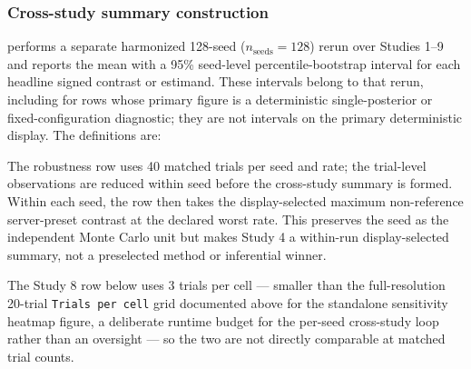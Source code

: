 \documentclass[
  english,
]{article}
\theoremstyle{plain}
\theoremstyle{definition}
\theoremstyle{remark}
\theoremstyle{definition}
\begin{document}
\subsubsection{Cross-study summary
construction}\label{cross-study-summary-construction}

 performs a separate harmonized
128-seed (\(n_{\text{seeds}} = 128\)) rerun over Studies 1--9 and
reports the mean with a 95\% seed-level percentile-bootstrap interval
for each headline signed contrast or estimand. These intervals belong to
that rerun, including for rows whose primary figure is a deterministic
single-posterior or fixed-configuration diagnostic; they are not
intervals on the primary deterministic display. The definitions are:

The robustness row uses 40 matched trials per seed and rate; the
trial-level observations are reduced within seed before the cross-study
summary is formed. Within each seed, the row then takes the
display-selected maximum non-reference server-preset contrast at the
declared worst rate. This preserves the seed as the independent Monte
Carlo unit but makes Study 4 a within-run display-selected summary, not
a preselected method or inferential winner.

The Study 8 row below uses 3 trials per cell --- smaller than the
full-resolution 20-trial \texttt{Trials\ per\ cell} grid documented
above for the standalone sensitivity heatmap figure, a deliberate
runtime budget for the per-seed cross-study loop rather than an
oversight --- so the two are not directly comparable at matched trial
counts.
\end{document}
